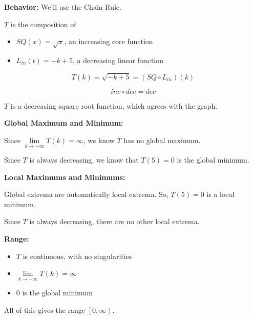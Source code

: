 \documentclass{ximera}
\begin{document}
\begin{example}
\textbf{Behavior:}  We'll use the Chain Rule.

$T$ is the composition of

\begin{itemize}
\item $SQ(x) = \sqrt{x}$, an increasing core function
\item $L_{in}(t) = -k + 5$, a decreasing linear function
\end{itemize}


\[  T(k) =  \sqrt{-k+5} = (SQ \circ L_{in})(k) \]

\[ inc \circ dec = dec  \]


$T$ is a decreasing square root function, which agrees with the graph.





\textbf{Global Maximum and Minimum:} 


Since $\lim\limits_{k \to -\infty} T(k) = \infty$, we know $T$ has no global maximum.

Since $T$ is always decreasing, we know that $T(5) = 0$ is the global minimum.


\textbf{Local Maximums and Minimums:} 

Global extrema are automatically local extrema.  So, $T(5) = 0$ is a local minimum.

Since $T$ is always decreasing, there are no other local extrema.


\textbf{Range:} 

\begin{itemize}
\item $T$ is continuous, with no singularities
\item $\lim\limits_{k \to -\infty} T(k) = \infty$
\item $0$ is the global minimum
\end{itemize}

All of this gives the range  $\left[ 0, \infty \right)$.






\end{example}
\end{document}
